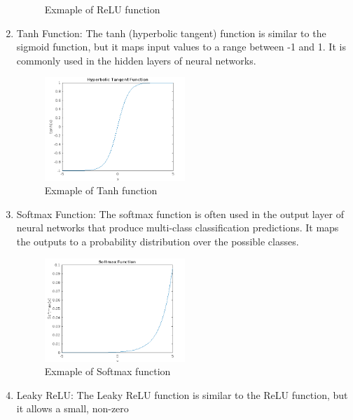 \begin{enumerate}
\begin{center}
\begin{figure}[!ht]
            \caption{Exmaple of ReLU function}
            \label{fig:relu}
        \end{figure}
    \end{center}
    \item Tanh Function: The tanh (hyperbolic tangent) function is similar to the sigmoid function,
    but it maps input values to a range between -1 and 1. It is commonly used in the hidden layers of neural networks.
    \begin{center}
        \begin{figure}[!ht]
            \centering
            \includegraphics[width=0.5\textwidth]{figures/tanh}
            \caption{Exmaple of Tanh function}
            \label{fig:tahn}
        \end{figure}
    \end{center}
    \item Softmax Function: The softmax function is often used in the output layer of neural networks that produce
    multi-class classification predictions. It maps the outputs to a probability distribution over the possible classes.
    \begin{center}
        \begin{figure}[!ht]
            \centering
            \includegraphics[width=0.5\textwidth]{figures/softmax}
            \caption{Exmaple of Softmax function}
            \label{fig:sigmsoftmaxoid}
        \end{figure}
    \end{center}
    \item Leaky ReLU: The Leaky ReLU function is similar to the ReLU function, but it allows a small, non-zero

\end{enumerate}
